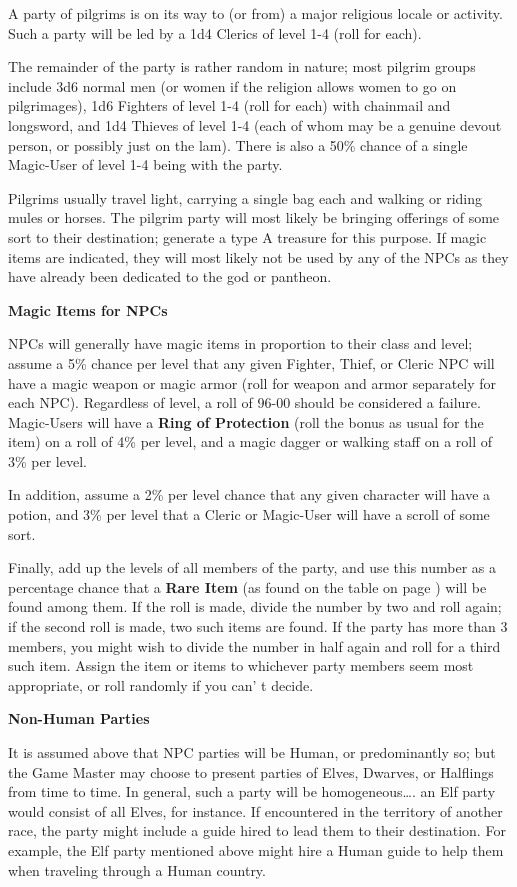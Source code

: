 \documentclass[a4paper,twoside,openany,10pt]{book}
\begin{document}
\begin{multicols}{2}
A party of pilgrims is on its way to (or from) a major religious locale or activity. Such a party will be led by a 1d4 Clerics of level 1-4 (roll for each).

The remainder of the party is rather random in nature; most pilgrim groups include 3d6 normal men (or women if the religion allows women to go on pilgrimages), 1d6 Fighters of level 1-4 (roll for each) with chainmail and longsword, and 1d4 Thieves of level 1-4 (each of whom may be a genuine devout person, or possibly just on the lam). There is also a 50\% chance of a single Magic-User of level 1-4 being with the party. 

Pilgrims usually travel light, carrying a single bag each and walking or riding mules or horses. The pilgrim party will most likely be bringing offerings of some sort to their destination; generate a type A treasure for this purpose. If magic items are indicated, they will most likely not be used by any of the NPCs as they have already been dedicated to the god or pantheon.

\textbf{Magic Items for NPCs}

NPCs will generally have magic items in proportion to their class and level; assume a 5\% chance per level that any given Fighter, Thief, or Cleric NPC will have a magic weapon or magic armor (roll for weapon and armor separately for each NPC). Regardless of level, a roll of 96-00 should be considered a failure. Magic-Users will have a \textbf{Ring of Protection} (roll the bonus as usual for the item) on a roll of 4\% per level, and a magic dagger or walking staff on a roll of 3\% per level.

In addition, assume a 2\% per level chance that any given character will have a potion, and 3\% per level that a Cleric or Magic-User will have a scroll of some sort.

Finally, add up the levels of all members of the party, and use this number as a percentage chance that a \textbf{Rare Item} (as found on the table on page \hyperlink{rare-items}{\pageref{rare-items}}) will be found among them. If the roll is made, divide the number by two and roll again; if the second roll is made, two such items are found. If the party has more than 3 members, you might wish to divide the number in half again and roll for a third such item. Assign the item or items to whichever party members seem most appropriate, or roll randomly if you can' t decide.

\textbf{Non-Human Parties}

It is assumed above that NPC parties will be Human, or predominantly so; but the Game Master may choose to present parties of Elves, Dwarves, or Halflings from time to time. In general, such a party will be homogeneous\ldots. an Elf party would consist of all Elves, for instance. If encountered in the territory of another race, the party might include a guide hired to lead them to their destination. For example, the Elf party mentioned above might hire a Human guide to help them when traveling through a Human country.


\end{multicols}
\end{document}
